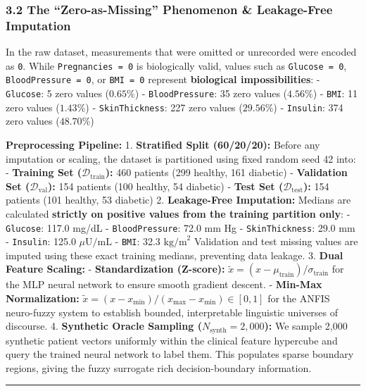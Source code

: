 \subsubsection{3.2 The ``Zero-as-Missing'' Phenomenon \& Leakage-Free
Imputation}\label{the-zero-as-missing-phenomenon-leakage-free-imputation}

In the raw dataset, measurements that were omitted or unrecorded were
encoded as \texttt{0}. While \texttt{Pregnancies\ =\ 0} is biologically
valid, values such as \texttt{Glucose\ =\ 0},
\texttt{BloodPressure\ =\ 0}, or \texttt{BMI\ =\ 0} represent
\textbf{biological impossibilities}: - \texttt{Glucose}: 5 zero values
(\(0.65\%\)) - \texttt{BloodPressure}: 35 zero values (\(4.56\%\)) -
\texttt{BMI}: 11 zero values (\(1.43\%\)) - \texttt{SkinThickness}: 227
zero values (\(29.56\%\)) - \texttt{Insulin}: 374 zero values
(\(48.70\%\))

\textbf{Preprocessing Pipeline:} 1. \textbf{Stratified Split
(60/20/20):} Before any imputation or scaling, the dataset is
partitioned using fixed random seed 42 into: - \textbf{Training Set
(\(\mathcal{D}_{\text{train}}\)):} 460 patients (299 healthy, 161
diabetic) - \textbf{Validation Set (\(\mathcal{D}_{\text{val}}\)):} 154
patients (100 healthy, 54 diabetic) - \textbf{Test Set
(\(\mathcal{D}_{\text{test}}\)):} 154 patients (101 healthy, 53
diabetic) 2. \textbf{Leakage-Free Imputation:} Medians are calculated
\textbf{strictly on positive values from the training partition only}: -
\texttt{Glucose}: 117.0 mg/dL - \texttt{BloodPressure}: 72.0 mm Hg -
\texttt{SkinThickness}: 29.0 mm - \texttt{Insulin}: 125.0
\(\mu\text{U/mL}\) - \texttt{BMI}: 32.3 \(\text{kg/m}^2\) Validation and
test missing values are imputed using these exact training medians,
preventing data leakage. 3. \textbf{Dual Feature Scaling:} -
\textbf{Standardization (Z-score):}
\(\tilde{x} = (x - \mu_{\text{train}}) / \sigma_{\text{train}}\) for the
MLP neural network to ensure smooth gradient descent. - \textbf{Min-Max
Normalization:}
\(\tilde{x} = (x - x_{\text{min}}) / (x_{\text{max}} - x_{\text{min}}) \in [0, 1]\)
for the ANFIS neuro-fuzzy system to establish bounded, interpretable
linguistic universes of discourse. 4. \textbf{Synthetic Oracle Sampling
(\(N_{\text{synth}} = 2{,}000\)):} We sample 2,000 synthetic patient
vectors uniformly within the clinical feature hypercube and query the
trained neural network to label them. This populates sparse boundary
regions, giving the fuzzy surrogate rich decision-boundary information.

\begin{center}\rule{0.5\linewidth}{0.5pt}\end{center}


